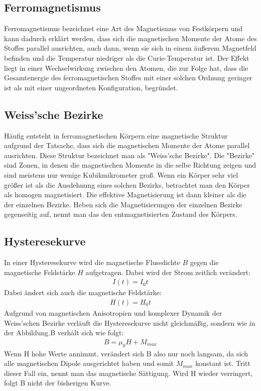 \documentclass[a4paper,10pt]{scrartcl}
\begin{document}
	\subsection{Ferromagnetismus}
		
		Ferromagnetismus bezeichnet eine Art des Magnetismus von Festkörpern und kann dadurch erklärt werden, dass sich die magnetischen Momente der Atome des Stoffes parallel ausrichten, auch dann, wenn sie sich in einem äußerem Magnetfeld befinden und die Temperatur niedriger als die Curie-Temperatur ist. Der Effekt liegt in einer Wechselwirkung zwischen den Atomen, die zur Folge hat, dass die Gesamtenergie des ferromagnetischen Stoffes mit einer solchen Ordnung geringer ist als mit einer ungeordneten Konfiguration, begründet.
		
	\subsection{Weiss'sche Bezirke}
		
		Häufig entsteht in ferromagnetischen Körpern eine magnetische Struktur aufgrund der Tatsache, dass sich die magnetischen Momente der Atome parallel ausrichten. Diese Struktur bezeichnet man als "Weiss'sche Bezirke". Die "Bezirke" sind Zonen, in denen die magnetischen Momente in die selbe Richtung zeigen und sind meistens nur wenige Kubikmikrometer groß. Wenn ein Körper sehr viel größer ist als die Ausdehnung eines solchen Bezirks, betrachtet man den Körper als homogen magnetisiert. Die effektive Magnetisierung ist dann kleiner als die der einzelnen Bezirke. Heben sich die Magnetisierungen der einzelnen Bezirke gegenseitig auf, nennt man das den entmagnetisierten Zustand des Körpers.
		
	\subsection{Hysteresekurve}
	
		In einer Hysteresekurve wird die magnetische Flussdichte \(B\) gegen die magnetische Feldstärke \(H\) aufgetragen. Dabei wird der Strom zeitlich verändert:
		\begin{align}
		I(t)=I_{0}t
		\end{align}
		Dabei ändert sich auch die magnetische Feldstärke:
		\begin{align}
		H(t)=H_{0}t
		\end{align}
		Aufgrund von magnetischen Anisotropien und komplexer Dynamik der Weiss'schen Bezirke verläuft die Hysteresekurve nicht gleichmäßig, sondern wie in der Abbildung.B verhält sich wie folgt:
		\begin{align}
		B=\mu_{0}H+M_{max}
		\end{align}
		Wenn H hohe Werte annimmt, verändert sich B also nur noch langsam, da sich alle magnetischen Dipole ausgerichtet haben und somit \(M_{max}\) konstant ist. Tritt dieser Fall ein, nennt man das magnetische Sättigung. Wird H wieder verringert, folgt B nicht der bisherigen Kurve.
		\newpage
		
\end{document}
